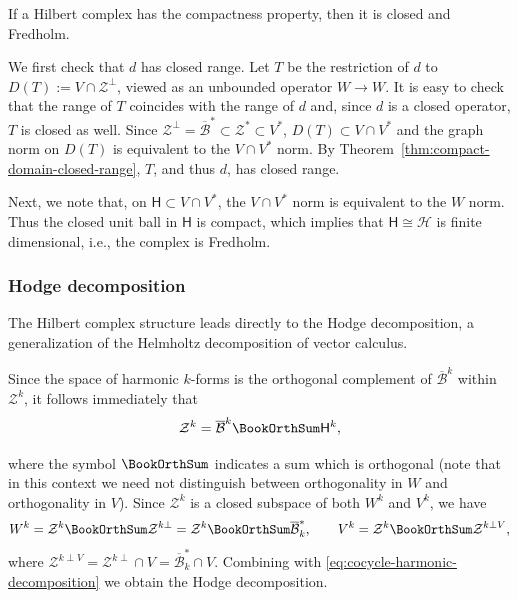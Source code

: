 \begin{Theorem}\label{thm:compactness-implies-fredholm}
{If a Hilbert complex has the compactness property, then it is closed and Fredholm.}
\end{Theorem}

\begin{Proof}
{We first check that $d$ has closed range. Let $T$ be the restriction of $d$ to $D(T):=V\cap\mathcal Z^\perp$, viewed as an unbounded operator $W\to W$. It is easy to check that the range of $T$ coincides with the range of $d$ and, since $d$ is a closed operator, $T$ is closed as well. Since $\mathcal Z^\perp=\overline{\mathcal B}^*\subset\mathcal Z^*\subset V^*$, $D(T)\subset V\cap V^*$ and the graph norm on $D(T)$ is equivalent to the $V\cap V^*$ norm. By Theorem~\ref{thm:compact-domain-closed-range}, $T$, and thus $d$, has closed range.}

{Next, we note that, on $\mathsf H\subset V\cap V^*$, the $V\cap V^*$ norm is equivalent to the $W$ norm. Thus the closed unit ball in $\mathsf H$ is compact, which implies that $\mathsf H\cong\mathcal H$ is finite dimensional, i.e., the complex is Fredholm.}
\end{Proof}

\subsubsection{{Hodge decomposition}}\label{subsec:hodge-decomposition}

{The Hilbert complex structure leads directly to the Hodge decomposition, a generalization of the Helmholtz decomposition of vector calculus.}

{Since the space of harmonic $k$-forms is the orthogonal complement of $\overline{\mathcal B}^k$ within $\mathcal Z^k$, it follows immediately that}
\begin{equation}\label{eq:cocycle-harmonic-decomposition}
\mathcal Z^k=\overline{\mathcal B}^k\BookOrthSum\mathsf H^k,
\end{equation}

{where the symbol $\BookOrthSum$ indicates a sum which is orthogonal (note that in this context we need not distinguish between orthogonality in $W$ and orthogonality in $V$). Since $\mathcal Z^k$ is a closed subspace of both $W^k$ and $V^k$, we have}
\[
W^k=\mathcal Z^k\BookOrthSum\mathcal Z^{k\perp}=\mathcal Z^k\BookOrthSum\overline{\mathcal B}_k^*,\qquad V^k=\mathcal Z^k\BookOrthSum\mathcal Z^{k\perp V},
\]
{where $\mathcal Z^{k\perp V}=\mathcal Z^{k\perp}\cap V=\overline{\mathcal B}_k^*\cap V$. Combining with \eqref{eq:cocycle-harmonic-decomposition} we obtain the Hodge decomposition.}

